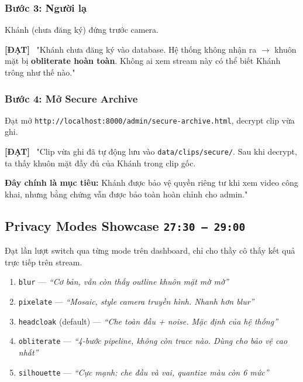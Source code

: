 \documentclass[12pt, a4paper]{article}
\newcommand{\timing}[1]{%
  \hfill\colorbox{NavyBlue!20}{\texttt{\small #1}}%
}
\newcommand{\dat}{\textcolor{BrickRed}{\textbf{[ĐẠT]}}}
\begin{document}
\subsubsection*{Bước 3: Người lạ}

\begin{action}
Khánh (chưa đăng ký) đứng trước camera.
\end{action}

\begin{dialog}{\dat\ }
"Khánh chưa đăng ký vào database.
Hệ thống không nhận ra $\rightarrow$ khuôn mặt bị \textbf{obliterate hoàn toàn}.
Không ai xem stream này có thể biết Khánh trông như thế nào."
\end{dialog}

\subsubsection*{Bước 4: Mở Secure Archive}

\begin{action}
Đạt mở \texttt{http://localhost:8000/admin/secure-archive.html},
decrypt clip vừa ghi.
\end{action}

\begin{dialog}{\dat\ }
"Clip vừa ghi đã tự động lưu vào \texttt{data/clips/secure/}.
Sau khi decrypt, ta thấy khuôn mặt đầy đủ của Khánh trong clip gốc.

\textbf{Đây chính là mục tiêu:}
Khánh được bảo vệ quyền riêng tư khi xem video công khai,
nhưng bằng chứng vẫn được bảo toàn hoàn chỉnh cho admin."
\end{dialog}

\subsection{Privacy Modes Showcase \timing{27:30 – 29:00}}

\begin{action}
Đạt lần lượt switch qua từng mode trên dashboard,
chỉ cho thầy cô thấy kết quả trực tiếp trên stream.
\end{action}

\begin{tcolorbox}[colback=NavyBlue!4, colframe=NavyBlue, title=\textbf{Demo sequence}]
\begin{enumerate}
  \item \texttt{blur} --- \textit{``Cơ bản, vẫn còn thấy outline khuôn mặt mờ mờ''}
  \item \texttt{pixelate} --- \textit{``Mosaic, style camera truyền hình. Nhanh hơn blur''}
  \item \texttt{headcloak} (default) --- \textit{``Che toàn đầu + noise. Mặc định của hệ thống''}
  \item \texttt{obliterate} --- \textit{``4-bước pipeline, không còn trace nào. Dùng cho bảo vệ cao nhất''}
  \item \texttt{silhouette} --- \textit{``Cực mạnh: che đầu và vai, quantize màu còn 6 mức''}
\end{enumerate}
\end{tcolorbox}
\end{document}
